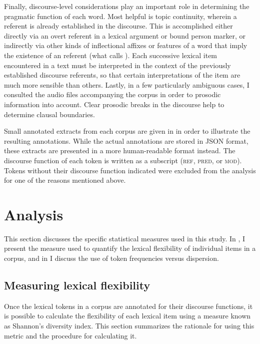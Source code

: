Finally, discourse-level considerations play an important role in determining the pragmatic function of each word. Most helpful is topic continuity, wherein a referent is already established in the discourse. This is accomplished either directly via an overt referent in a lexical argument or bound person marker, or indirectly via other kinds of inflectional affixes or features of a word that imply the existence of an referent (what \textcite{Kibrik2011} calls ). Each successive lexical item encountered in a text must be interpreted in the context of the previously established discourse referents, so that certain interpretations of the item are much more sensible than others. Lastly, in a few particularly ambiguous cases, I consulted the audio files accompanying the corpus in order to prosodic information into account. Clear prosodic breaks in the discourse help to determine clausal boundaries.

Small annotated extracts from each corpus are given in  in order to illustrate the resulting annotations. While the actual annotations are stored in JSON format, these extracts are presented in a more human-readable format instead. The discourse function of each token is written as a subscript (\textsc{ref}, \textsc{pred}, or \textsc{mod}). Tokens without their discourse function indicated were excluded from the analysis for one of the reasons mentioned above.

\section{Analysis}
\label{sec:3.4}

This section discusses the specific statistical measures used in this study. In , I present the measure used to quantify the lexical flexibility of individual items in a corpus, and in  I discuss the use of token frequencies versus dispersion.

\subsection{Measuring lexical flexibility}
\label{sec:3.4.1}

Once the lexical tokens in a corpus are annotated for their discourse functions, it is possible to calculate the flexibility of each lexical item using a measure known as Shannon's diversity index. This section summarizes the rationale for using this metric and the procedure for calculating it.

